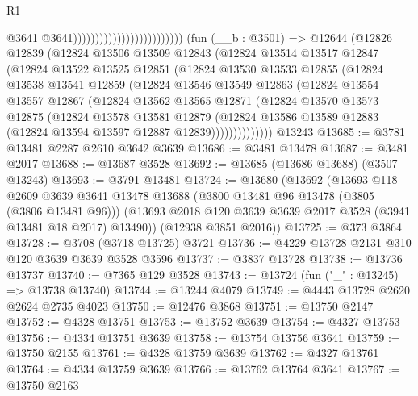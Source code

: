\begin{lexlean}{R1}
\begin{coremodule}
                                                      @3641
                                                      @3641)))))))))))))))))))))))))
    (fun (__b : @3501) =>
    @12644
      (@12826
        @12839
        (@12824
          @13506
          @13509
          @12843
          (@12824
            @13514
            @13517
            @12847
            (@12824
              @13522
              @13525
              @12851
              (@12824
                @13530
                @13533
                @12855
                (@12824
                  @13538
                  @13541
                  @12859
                  (@12824
                    @13546
                    @13549
                    @12863
                    (@12824
                      @13554
                      @13557
                      @12867
                      (@12824
                        @13562
                        @13565
                        @12871
                        (@12824
                          @13570
                          @13573
                          @12875
                          (@12824
                            @13578
                            @13581
                            @12879
                            (@12824
                              @13586
                              @13589
                              @12883
                              (@12824 @13594 @13597 @12887 @12839))))))))))))))
    @13243
@13685 := @3781 @13481 @2287 @2610 @3642 @3639
@13686 := @3481 @13478
@13687 := @3481 @2017
@13688 := @13687 @3528
@13692 := @13685 (@13686 @13688) (@3507 @13243)
@13693 := @3791 @13481
@13724 := @13680
    (@13692
      (@13693
        @118
        @2609
        @3639
        @3641
        @13478
        @13688
        (@3800 @13481 @96 @13478 (@3805 (@3806 @13481 @96)))
        (@13693 @2018 @120 @3639 @3639 @2017 @3528 (@3941 @13481 @18 @2017) @13490))
      (@12938 @3851 @2016))
@13725 := @373 @3864
@13728 := @3708 (@3718 @13725) @3721
@13736 := @4229 @13728 @2131 @310 @120 @3639 @3639 @3528 @3596
@13737 := @3837 @13728
@13738 := @13736 @13737
@13740 := @7365 @129 @3528
@13743 := @13724 (fun ("_" : @13245) => @13738 @13740)
@13744 := @13244 @4079
@13749 := @4443 @13728 @2620 @2624 @2735 @4023
@13750 := @12476 @3868
@13751 := @13750 @2147
@13752 := @4328 @13751
@13753 := @13752 @3639
@13754 := @4327 @13753
@13756 := @4334 @13751 @3639
@13758 := @13754 @13756 @3641
@13759 := @13750 @2155
@13761 := @4328 @13759 @3639
@13762 := @4327 @13761
@13764 := @4334 @13759 @3639
@13766 := @13762 @13764 @3641
@13767 := @13750 @2163

\end{coremodule}
\end{lexlean}
